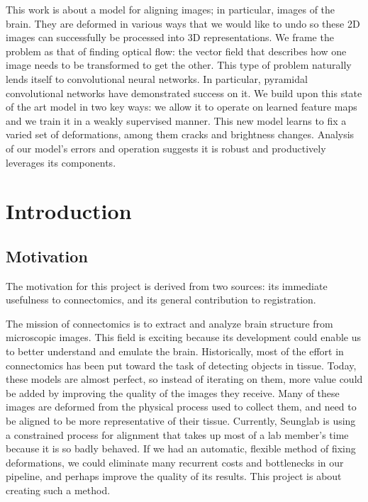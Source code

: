 \documentclass[12pt,a4paper]{article}
\begin{document}
This work is about a model for aligning images; in particular, images of the brain. They are deformed in various ways that we would like to undo so these 2D images can successfully be processed into 3D representations. We frame the problem as that of finding optical flow: the vector field that describes how one image needs to be transformed to get the other. This type of problem naturally lends itself to convolutional neural networks. In particular, pyramidal convolutional networks have demonstrated success on it. We build upon this state of the art model in two key ways: we allow it to operate on learned feature maps and we train it in a weakly supervised manner. This new model learns to fix a varied set of deformations, among them cracks and brightness changes. Analysis of our model's errors and operation suggests it is robust and productively leverages its components.

\newpage



\section{Introduction}

\subsection{Motivation}

The motivation for this project is derived from two sources: its immediate usefulness to  connectomics, and its general contribution to registration.

The mission of connectomics is to extract and analyze brain structure from microscopic images. This field is exciting because its development could enable us to better understand and emulate the brain. Historically, most of the effort in connectomics has been put toward the task of detecting objects in tissue. Today, these models are almost perfect, so instead of iterating on them, more value could be added by improving the quality of the images they receive. Many of these images are deformed from the physical process used to collect them, and need to be aligned to be more representative of their  tissue. Currently, Seunglab is using a constrained process for alignment that takes up most of a lab member's time because it is so badly behaved. If we had an automatic, flexible method of fixing deformations, we could eliminate many recurrent costs and bottlenecks in our pipeline, and perhaps improve the quality of its results. This project is about creating such a method.
\end{document}

